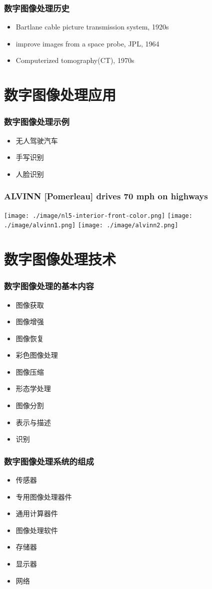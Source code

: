 \documentclass{beamer}
\begin{document}
\begin{frame}
\frametitle{数字图像处理历史}
\label{sec-1-8}

\begin{itemize}
\item Bartlane cable picture transmission system, 1920s
\item improve images from a space probe, JPL, 1964
\item Computerized tomography(CT), 1970s
\end{itemize}
\end{frame}
\section{数字图像处理应用}
\label{sec-2}
\begin{frame}
\frametitle{数字图像处理示例}
\label{sec-2-1}

\begin{itemize}
\item 无人驾驶汽车
\item 手写识别
\item 人脸识别
\end{itemize}
\end{frame}
\begin{frame}
\frametitle{ALVINN [Pomerleau] drives 70 mph on highways}
\label{sec-2-2}


\texttt{[image: ./image/nl5-interior-front-color.png]}
\texttt{[image: ./image/alvinn1.png]}
\texttt{[image: ./image/alvinn2.png]}
\end{frame}
\section{数字图像处理技术}
\label{sec-3}
\begin{frame}
\frametitle{数字图像处理的基本内容}
\label{sec-3-1}

\begin{itemize}
\item 图像获取
\item 图像增强
\item 图像恢复
\item 彩色图像处理
\item 图像压缩
\item 形态学处理
\item 图像分割
\item 表示与描述
\item 识别
\end{itemize}
\end{frame}
\begin{frame}
\frametitle{数字图像处理系统的组成}
\label{sec-3-2}

\begin{itemize}
\item 传感器
\item 专用图像处理器件
\item 通用计算器件
\item 图像处理软件
\item 存储器
\item 显示器
\item 网络
\end{itemize}
\end{frame}
\end{document}
